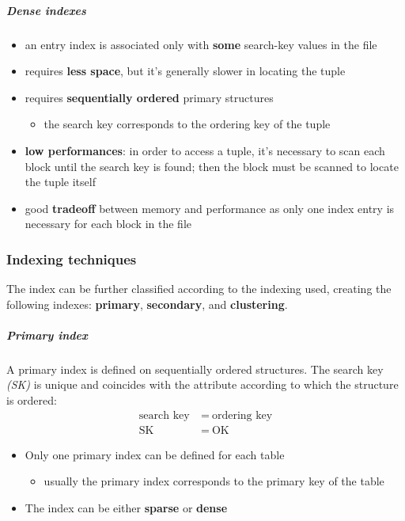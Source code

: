 \documentclass[english]{article}
\begin{document}
\subparagraph*{Dense indexes}
\begin{itemize}
  \item an entry index is associated only with \textbf{some} search-key values in the file
  \item requires \textbf{less space}, but it's generally slower in locating the tuple
  \item requires\textbf{ sequentially ordered} primary structures
        \begin{itemize}[label=\(\rightarrow\)]
          \item the search key corresponds to the ordering key of the tuple
        \end{itemize}
  \item \textbf{low performances}: in order to access a tuple, it's necessary to scan each block until the search key is found; then the block must be scanned to locate the tuple itself
  \item good \textbf{tradeoff} between memory and performance as only one index entry is necessary for each block in the file
\end{itemize}

\subsubsection{Indexing techniques}

The index can be further classified according to the indexing used, creating the following indexes: \textbf{primary}, \textbf{secondary}, and \textbf{clustering}.

\subparagraph*{Primary index}
A primary index is defined on sequentially ordered structures.
The search key \textit{(SK)} is unique and coincides with the attribute according to which the structure is ordered:
\begin{align*}
  \text{search key} \  & = \ \text{ordering key} \\
  \text{SK} \          & = \ \text{OK}
\end{align*}

\begin{itemize}
  \item Only one primary index can be defined for each table
        \begin{itemize}
          \item usually the primary index corresponds to the primary key of the table
        \end{itemize}
  \item The index can be either \textbf{sparse} or \textbf{dense}
\end{itemize}
\end{document}
